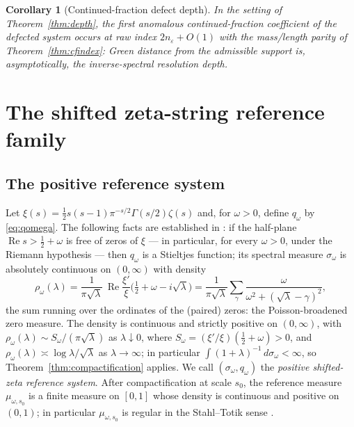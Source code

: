 \documentclass[11pt]{amsart}
\newtheorem{corollary}[theorem]{Corollary}
\theoremstyle{definition}
\theoremstyle{remark}
\newcommand{\dd}{\,d}
\newcommand{\eps}{\varepsilon}
\DeclareMathOperator{\Rea}{Re}
\begin{document}
\begin{corollary}[Continued-fraction defect depth]\label{cor:cfdepth}
In the setting of Theorem~\ref{thm:depth}, the first anomalous
continued-fraction coefficient of the defected system occurs at raw index
$2n_\eps+O(1)$ with the mass/length parity of Theorem~\ref{thm:cfindex}:
Green distance from the admissible support is, asymptotically, the
inverse-spectral resolution depth.
\end{corollary}

\section{The shifted zeta-string reference family}\label{sec:zeta}

\subsection{The positive reference system}
Let $\xi(s)=\tfrac12 s(s-1)\pi^{-s/2}\Gamma(s/2)\zeta(s)$ and, for
$\omega>0$, define $q_\omega$ by \eqref{eq:qomega}. The following facts are
established in \cite{Suzuki2023,MarginPaper,StringPaper}: if the half-plane
$\Rea s>\tfrac12+\omega$ is free of zeros of $\xi$ --- in particular, for
every $\omega>0$, under the Riemann hypothesis --- then $q_\omega$ is a
Stieltjes function; its spectral measure $\sigma_\omega$ is absolutely
continuous on $(0,\infty)$ with density
\begin{equation}\label{eq:density}
\rho_\omega(\lambda)
=\frac{1}{\pi\sqrt{\lambda}}\,
\Rea\frac{\xi'}{\xi}\Big(\tfrac12+\omega-i\sqrt\lambda\Big)
=\frac{1}{\pi\sqrt\lambda}\sum_{\gamma}
\frac{\omega}{\omega^2+(\sqrt\lambda-\gamma)^2},
\end{equation}
the sum running over the ordinates of the (paired) zeros: the
Poisson-broadened zero measure. The density is continuous and strictly
positive on $(0,\infty)$, with $\rho_\omega(\lambda)\sim
S_\omega/(\pi\sqrt\lambda)$ as $\lambda\downarrow0$, where
$S_\omega=(\xi'/\xi)(\tfrac12+\omega)>0$, and
$\rho_\omega(\lambda)\asymp\log\lambda/\sqrt\lambda$ as
$\lambda\to\infty$; in particular
$\int(1+\lambda)^{-1}\dd\sigma_\omega<\infty$, so
Theorem~\ref{thm:compactification} applies. We call
$(\sigma_\omega,q_\omega)$ the \emph{positive shifted-zeta reference
system}. After compactification at scale $s_0$, the reference measure
$\mu_{\omega,s_0}$ is a finite measure on $[0,1]$ whose density is
continuous and positive on $(0,1)$; in particular $\mu_{\omega,s_0}$ is
regular in the Stahl--Totik sense \cite{StahlTotik}.
\end{document}

